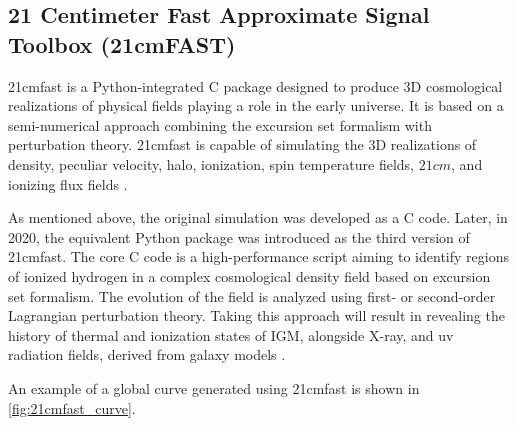 \documentclass[12pt, TexShade, letterpaper]{report}
\begin{document}
\subsection{21 Centimeter Fast Approximate Signal Toolbox (21cmFAST)}
\gls{21cmfast} is a Python-integrated C package designed to produce 3D cosmological realizations of physical fields playing a role in the early universe. It is based on a semi-numerical approach combining the excursion set formalism with perturbation theory. \gls{21cmfast} is capable of simulating the 3D realizations of density, peculiar velocity, halo, ionization, spin temperature fields, $21cm$, and ionizing flux fields \cite{21cmfast_c, 21cmfast_python, 21cmfast_documentation, 21cmfast_github}.\par
As mentioned above, the original simulation was developed as a C code. Later, in 2020, the equivalent Python package was introduced as the third version of \gls{21cmfast}. The core C code is a high-performance script aiming to identify regions of ionized hydrogen in a complex cosmological density field based on excursion set formalism. The evolution of the field is analyzed using first- or second-order Lagrangian perturbation theory. Taking this approach will result in revealing the history of thermal and ionization states of IGM, alongside X-ray, and \gls{uv} radiation fields, derived from galaxy models \cite{21cmfast_c}. \par
An example of a global curve generated using \gls{21cmfast} is shown in \ref{fig:21cmfast_curve}.
\end{document}
